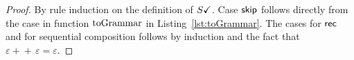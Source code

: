 \begin{proof}
  By rule induction on the definition of $S\checkmark$. Case $\mathsf{skip}$ 
  follows directly from the case in function
  $\toGrammark$ in Listing~\ref{lst:toGrammar}. The cases for
  $\mathsf{rec}$  and for
  sequential composition follows by induction and the fact that
  $\varepsilon+\!\!+\,\varepsilon=\varepsilon$.
\end{proof}

